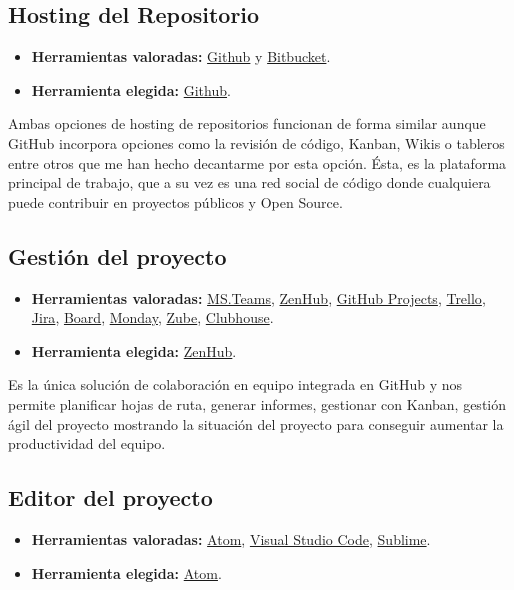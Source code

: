 \subsection{Hosting del Repositorio}
\begin{itemize}
    \item \textbf{Herramientas valoradas:} \href{https://github.com/}{Github} y \href{https://bitbucket.org/product/}{Bitbucket}.
    \item \textbf{Herramienta elegida:} \href{https://github.com/}{Github}.
\end{itemize}

Ambas opciones de hosting de repositorios funcionan de forma similar aunque GitHub incorpora opciones como la revisión de código, Kanban, Wikis o tableros entre otros que me han hecho decantarme por esta opción.
Ésta, es la plataforma principal de trabajo, que a su vez es una red social de código donde cualquiera puede contribuir en proyectos públicos y Open Source.


\subsection{Gestión del proyecto}
\begin{itemize}
    \item \textbf{Herramientas valoradas:} \href{https://teams.microsoft.com/}{MS.Teams}, \href{https://www.zenhub.com/}{ZenHub}, \href{https://github.com/}{GitHub Projects}, \href{https://www.zenhub.com/}{Trello}, \href{https://www.atlassian.com/es/software/jira}{Jira}, \href{https://www.board.com/es#gref}{Board}, \href{https://monday.com/lang/es/}{Monday}, \href{https://zube.io/}{Zube}, \href{https://clubhouse.io/}{Clubhouse}.
    \item \textbf{Herramienta elegida:} \href{https://www.zenhub.com/}{ZenHub}.
\end{itemize}

Es la única solución de colaboración en equipo integrada en GitHub y nos permite planificar hojas de ruta, generar informes, gestionar con Kanban, gestión ágil del proyecto mostrando la situación del proyecto para conseguir aumentar la productividad del equipo.

\subsection{Editor del proyecto}
\begin{itemize}
    \item \textbf{Herramientas valoradas:} \href{https://atom.io/}{Atom}, \href{https://code.visualstudio.com/}{Visual Studio Code}, \href{https://www.sublimetext.com/}{Sublime}.
    \item \textbf{Herramienta elegida:} \href{https://atom.io/}{Atom}.
\end{itemize}

